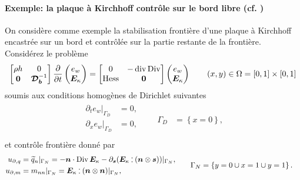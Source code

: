 \paragraph{Exemple: la plaque à Kirchhoff contrôle sur le bord libre (cf. )}
On considère comme exemple la stabilisation frontière d'une plaque à Kirchhoff encastrée sur un bord et contrôlée sur la partie restante de la frontière.  Considérez le problème 
\begin{equation*}
\begin{bmatrix}
\rho h & 0 \\ 
\bm{0} & \bm{\mathcal{D}_b}^{-1} \\
\end{bmatrix}
\diffp{}{t}
\begin{pmatrix}
e_w \\ \bm{E}_\kappa \\
\end{pmatrix} = 
\begin{bmatrix}
0 & -\div\Div \\ 
\Hess & \bm{0} \\
\end{bmatrix}
\begin{pmatrix}
e_w \\ \bm{E}_\kappa \\
\end{pmatrix} \qquad (x, y) \in \Omega = [0, 1]\times[0,1]
\end{equation*}
soumis aux conditions homogènes de Dirichlet suivantes
\begin{align*}
\begin{aligned}
\partial_t e_w|_{\Gamma_D} &= 0, \\
\partial_x e_w|_{\Gamma_D} &= 0, \\
\end{aligned} \qquad {\Gamma_D} &= \left\{x = 0 \right\},
\end{align*}
et contrôle frontière donné par
\begin{align*}
\begin{aligned}
u_{\partial, q} & = \widetilde{q}_n|_{\Gamma_N} = -\bm{n} \cdot \Div \bm{E}_\kappa - \partial_{\bm{s}} (\bm{E}_\kappa \cddot (\bm{n} \otimes \bm{s}))|_{\Gamma_N},\\
u_{\partial, m} &= m_{nn}|_{\Gamma_N} =\bm{E}_\kappa \cddot (\bm{n}\otimes \bm{n})|_{\Gamma_N}, \; \\
\end{aligned} \qquad {\Gamma_N} &= \left\{y = 0 \cup x=1 \cup y=1 \right\}.
\end{align*}
